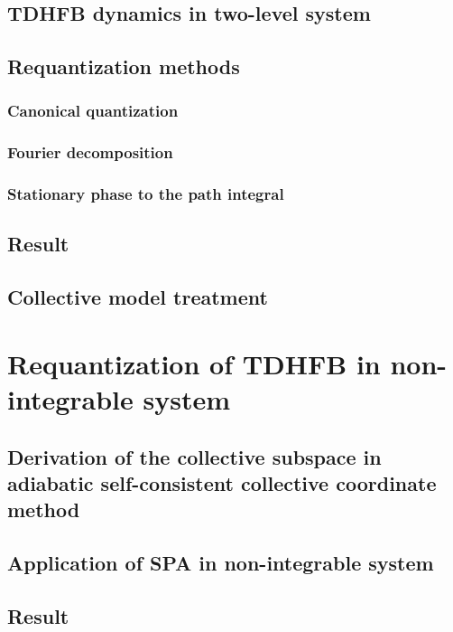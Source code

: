 \documentclass[11pt]{book} %
\begin{document}
\section{TDHFB dynamics in two-level system}

\section{Requantization methods}
\subsection{Canonical quantization}

\subsection{Fourier decomposition}

\subsection{Stationary phase to the path integral}

\section{Result}

\section{Collective model treatment} 

\chapter{Requantization of TDHFB in non-integrable system}

\section{Derivation of the collective subspace in adiabatic self-consistent collective coordinate method}

\section{Application of SPA in non-integrable system}

\section{Result}
\end{document}
